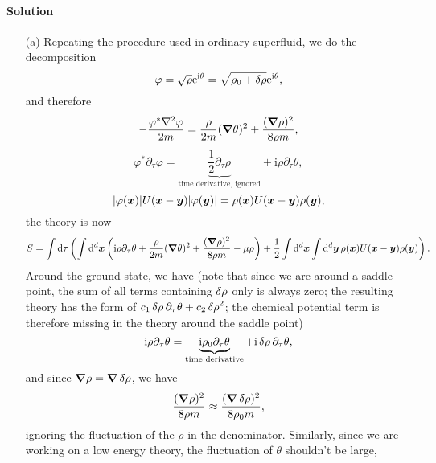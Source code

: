 \documentclass[hyperref, a4paper]{article}
\newcommand*{\ii}{\mathrm{i}}
\newcommand*{\ee}{\mathrm{e}}
\begin{document}
\paragraph{Solution} \begin{itemize}
\item[(a)] Repeating the procedure used in ordinary superfluid, we do the decomposition
\begin{equation}
    \varphi = \sqrt{\rho} \ee^{\ii \theta} = \sqrt{\rho_0 + \var{\rho}} \ee^{\ii \theta},
\end{equation}
and therefore 
\begin{equation}
    - \frac{\varphi^* \laplacian \varphi}{2m} = 
    \frac{\rho}{2m} (\grad{\theta})^2 + \frac{(\grad{\rho})^2}{8 \rho m} ,
\end{equation}
\begin{equation}
    \varphi^* \partial_\tau \varphi 
    = \underbrace{\frac{1}{2} \partial_\tau \rho}_{\text{time derivative, ignored}} + 
    \ii \rho \partial_\tau \theta,
\end{equation}
\begin{equation}
    \abs{\varphi(\vb*{x})} U(\vb*{x} - \vb*{y}) \abs{\varphi(\vb*{y})} = 
    \rho(\vb*{x}) U(\vb*{x} - \vb*{y}) \rho(\vb*{y}),
\end{equation}
the theory is now 
\begin{equation}
    S = \int \dd{\tau} \left(
        \int \dd[d]{\vb*{x}} \left(
            \ii \rho \partial_\tau \theta 
            + \frac{\rho}{2m} (\grad{\theta})^2 + \frac{(\grad{\rho})^2}{8 \rho m}
            - \mu \rho
        \right) + 
        \frac{1}{2} \int \dd[d]{\vb*{x}} \int \dd[d]{\vb*{y}}
        \rho(\vb*{x}) U(\vb*{x} - \vb*{y}) \rho(\vb*{y})
    \right).
\end{equation}
Around the ground state, we have 
(note that since we are around a saddle point,
the sum of all terms containing $\var{\rho}$ only is always zero;
the resulting theory has the form of $c_1 \var{\rho} \partial_\tau \theta + c_2 \var{\rho}^2$;
the chemical potential term is therefore missing in the theory around the saddle point)
\[
    \ii \rho \partial_\tau \theta = \underbrace{\ii \rho_0 \partial_\tau \theta}_{\text{time derivative}} 
    + \ii \var{\rho} \partial_\tau \theta,
\]
and since $\grad{\rho} = \grad{\var{\rho}}$,
we have 
\[
    \frac{(\grad{\rho})^2}{8 \rho m} \approx \frac{(\grad{\var{\rho}})^2}{8 \rho_0 m},
\]
ignoring the fluctuation of the $\rho$ in the denominator.
Similarly, since we are working on a low energy theory,
the fluctuation of $\theta$ shouldn't be large,

\end{itemize}
\end{document}
